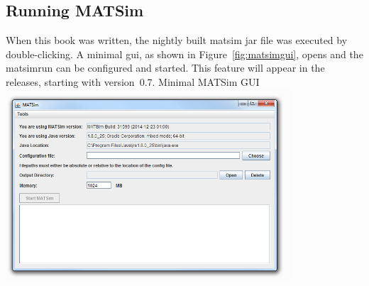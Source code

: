 \subsection{Running MATSim}
\label{sec:runexample}
When this book was written, the nightly built \gls{matsim} \gls{jar} file was executed by double-clicking. A minimal \gls{gui}, as shown in Figure~\ref{fig:matsimgui}, opens and the \gls{matsimrun} can be configured and started. 
This feature will appear in the releases, starting with version~0.7.
%
%
{Minimal MATSim GUI}%
{\label{fig:matsimgui}}%
{\includegraphics[width=0.8\textwidth, angle=0]{using/figures/matsimgui.png}}%
{}

